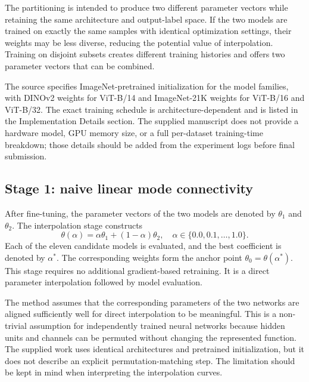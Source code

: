 \documentclass[11pt,a4paper]{article}
\begin{document}
The partitioning is intended to produce two different parameter vectors while retaining the same architecture and output-label space. If the two models are trained on exactly the same samples with identical optimization settings, their weights may be less diverse, reducing the potential value of interpolation. Training on disjoint subsets creates different training histories and offers two parameter vectors that can be combined.

The source specifies ImageNet-pretrained initialization for the model families, with DINOv2 weights for ViT-B/14 and ImageNet-21K weights for ViT-B/16 and ViT-B/32. The exact training schedule is architecture-dependent and is listed in the Implementation Details section. The supplied manuscript does not provide a hardware model, GPU memory size, or a full per-dataset training-time breakdown; those details should be added from the experiment logs before final submission.

\subsection{Stage 1: naive linear mode connectivity}
After fine-tuning, the parameter vectors of the two models are denoted by $\theta_1$ and $\theta_2$. The interpolation stage constructs
\begin{equation}
 \theta(\alpha)=\alpha\theta_1+(1-\alpha)\theta_2,
 \quad \alpha\in\{0.0,0.1,\ldots,1.0\}.
 \label{eq:stage1}
\end{equation}
Each of the eleven candidate models is evaluated, and the best coefficient is denoted by $\alpha^*$. The corresponding weights form the anchor point $\theta_0=\theta(\alpha^*)$. This stage requires no additional gradient-based retraining. It is a direct parameter interpolation followed by model evaluation.

The method assumes that the corresponding parameters of the two networks are aligned sufficiently well for direct interpolation to be meaningful. This is a non-trivial assumption for independently trained neural networks because hidden units and channels can be permuted without changing the represented function. The supplied work uses identical architectures and pretrained initialization, but it does not describe an explicit permutation-matching step. The limitation should be kept in mind when interpreting the interpolation curves.
\end{document}
